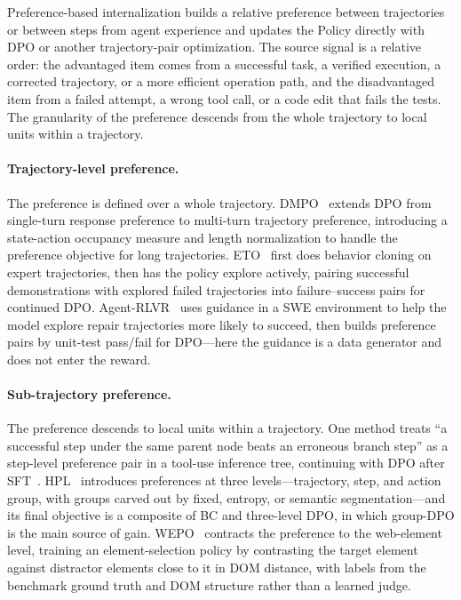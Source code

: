 Preference-based internalization builds a relative preference between trajectories or between steps from agent experience and updates the Policy directly with DPO or another trajectory-pair optimization. The source signal is a relative order: the advantaged item comes from a successful task, a verified execution, a corrected trajectory, or a more efficient operation path, and the disadvantaged item from a failed attempt, a wrong tool call, or a code edit that fails the tests. The granularity of the preference descends from the whole trajectory to local units within a trajectory.

\paragraph{Trajectory-level preference.} The preference is defined over a whole trajectory. DMPO~\cite{Shi24c} extends DPO from single-turn response preference to multi-turn trajectory preference, introducing a state-action occupancy measure and length normalization to handle the preference objective for long trajectories. ETO~\cite{Son24} first does behavior cloning on expert trajectories, then has the policy explore actively, pairing successful demonstrations with explored failed trajectories into failure--success pairs for continued DPO. Agent-RLVR~\cite{Da25} uses guidance in a SWE environment to help the model explore repair trajectories more likely to succeed, then builds preference pairs by unit-test pass/fail for DPO---here the guidance is a data generator and does not enter the reward.

\paragraph{Sub-trajectory preference.} The preference descends to local units within a trajectory. One method treats ``a successful step under the same parent node beats an erroneous branch step'' as a step-level preference pair in a tool-use inference tree, continuing with DPO after SFT~\cite{Che24k}. HPL~\cite{Gao25c} introduces preferences at three levels---trajectory, step, and action group, with groups carved out by fixed, entropy, or semantic segmentation---and its final objective is a composite of BC and three-level DPO, in which group-DPO is the main source of gain. WEPO~\cite{Liu25z} contracts the preference to the web-element level, training an element-selection policy by contrasting the target element against distractor elements close to it in DOM distance, with labels from the benchmark ground truth and DOM structure rather than a learned judge.

